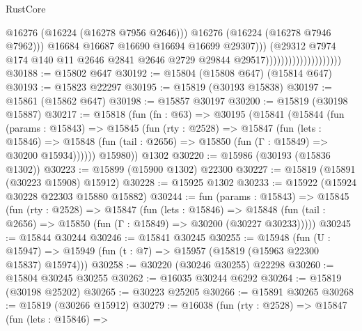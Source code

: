 \begin{lexlean}{RustCore}
\begin{coremodule}
                                                    @16276
                                                    (@16224 (@16278 @7956 @2646)))
                                                  @16276
                                                  (@16224 (@16278 @7946 @7962)))
                                                @16684
                                                @16687
                                                @16690
                                                @16694
                                                @16699
                                                @29307)))
                                          (@29312
                                            @7974
                                            @174
                                            @140
                                            @11
                                            @2646
                                            @2841
                                            @2646
                                            @2729
                                            @29844
                                            @29517))))))))))))))))))))
@30188 := @15802 @647
@30192 := @15804 (@15808 @647) (@15814 @647)
@30193 := @15823 @22297
@30195 := @15819 (@30193 @15838)
@30197 := @15861 (@15862 @647)
@30198 := @15857 @30197
@30200 := @15819 (@30198 @15887)
@30217 := @15818
    (fun (fn : @63) =>
    @30195
      (@15841
        (@15844
          (fun (params : @15843) =>
          @15845
            (fun (rty : @2528) =>
            @15847
              (fun (lets : @15846) =>
              @15848 (fun (tail : @2656) => @15850 (fun (Γ : @15849) => @30200 @15934))))))
        @15980))
    @1302
@30220 := @15986 (@30193 (@15836 @1302))
@30223 := @15899 (@15900 @1302) @22300
@30227 := @15819 (@15891 (@30223 @15908) @15912)
@30228 := @15925 @1302
@30233 := @15922 (@15924 @30228 @22303 @15880 @15882)
@30244 := fun (params : @15843) =>
  @15845
    (fun (rty : @2528) =>
    @15847
      (fun (lets : @15846) =>
      @15848 (fun (tail : @2656) => @15850 (fun (Γ : @15849) => @30200 (@30227 @30233)))))
@30245 := @15844 @30244
@30246 := @15841 @30245
@30255 := @15948
    (fun (U : @15947) => @15949 (fun (t : @7) => @15957 (@15819 (@15963 @22300 @15837) @15974)))
@30258 := @30220 (@30246 @30255) @22298
@30260 := @15804 @30245 @30255
@30262 := @16035 @30244 @6292
@30264 := @15819 (@30198 @25202)
@30265 := @30223 @25205
@30266 := @15891 @30265
@30268 := @15819 (@30266 @15912)
@30279 := @16038
    (fun (rty : @2528) =>
    @15847
      (fun (lets : @15846) =>

\end{coremodule}
\end{lexlean}
